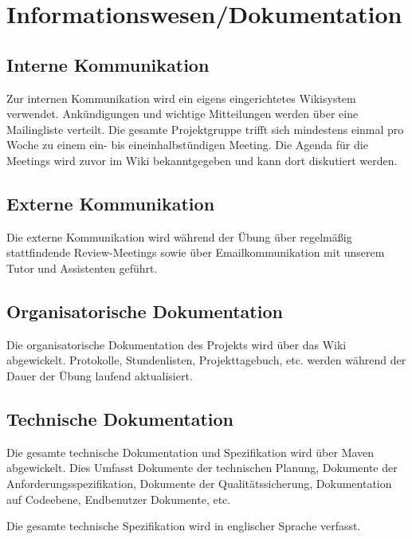 

\section{Informationswesen/Dokumentation}
\subsection{Interne Kommunikation}
Zur internen Kommunikation wird ein eigens eingerichtetes Wikisystem verwendet.
Ankündigungen und wichtige Mitteilungen werden über eine Mailingliste verteilt. 
Die gesamte Projektgruppe trifft sich mindestens einmal pro Woche zu einem ein- bis eineinhalbstündigen Meeting. 
Die Agenda für die Meetings wird zuvor im Wiki bekanntgegeben und kann dort diskutiert werden. 

\subsection{Externe Kommunikation}
Die externe Kommunikation wird während der Übung über regelmäßig stattfindende Review-Meetings sowie über Emailkommunikation mit unserem Tutor und Assistenten geführt.

\subsection{Organisatorische Dokumentation}
Die organisatorische Dokumentation des Projekts wird über das Wiki abgewickelt. 
Protokolle, Stundenlisten, Projekttagebuch, etc. werden während der Dauer der Übung laufend aktualisiert.

\subsection{Technische Dokumentation}
Die gesamte technische Dokumentation und Spezifikation wird über Maven abgewickelt. 
Dies Umfasst Dokumente der technischen Planung, Dokumente der Anforderungsspezifikation, 
Dokumente der Qualitätssicherung, Dokumentation auf Codeebene, Endbenutzer Dokumente, etc.

Die gesamte technische Spezifikation wird in englischer Sprache verfasst.

